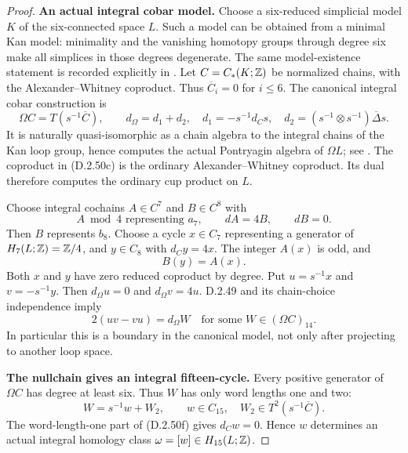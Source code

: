 \begin{proof}
\textbf{An actual integral cobar model.}
Choose a six-reduced simplicial model $K$ of the six-connected
space $L$. Such a model can be obtained from a minimal Kan
model: minimality and the vanishing homotopy groups through
degree six make all simplices in those degrees degenerate.
The same model-existence statement is recorded explicitly in
\cite[proof of Lemma 5.4.2, p.~43 in the opened author version]
{I_ABFJ2022}. Let $C=C_*(K;\mathbb Z)$ be normalized chains, with the
Alexander--Whitney coproduct. Thus $\overline C_i=0$ for
$i\le6$. The canonical integral cobar construction is
\[
 \Omega C=T(s^{-1}\overline C),\qquad
 d_\Omega=d_1+d_2,
 \quad d_1=-s^{-1}d_Cs,
 \quad d_2=(s^{-1}\otimes s^{-1})\overline\Delta s.
 \tag{D.2.50c}
\]
It is naturally quasi-isomorphic as a chain algebra to the
integral chains of the Kan loop group, hence computes the
actual Pontryagin algebra of $\Omega L$; see
\cite[pp.~3 and 5]{FGHHessParentScottTonks2005}.
The coproduct in \textup{(D.2.50c)} is the ordinary
Alexander--Whitney coproduct. Its dual therefore computes the
ordinary cup product on $L$.

Choose integral cochains $A\in C^7$ and $B\in C^8$ with
\[
       A\bmod4\text{ representing }a_7,
       \qquad dA=4B,
       \qquad dB=0.
       \tag{D.2.50d}
\]
Then $B$ represents $b_8$. Choose a cycle $x\in C_7$
representing a generator of $H_7(L;\mathbb Z)=\mathbb Z/4$, and
$y\in C_8$ with $d_Cy=4x$. The integer $A(x)$ is odd, and
\[
                         B(y)=A(x).
                         \tag{D.2.50e}
\]
Both $x$ and $y$ have zero reduced coproduct by degree.
Put $u=s^{-1}x$ and $v=-s^{-1}y$. Then
$d_\Omega u=0$ and $d_\Omega v=4u$. D.2.49 and its
chain-choice independence imply
\[
       2(uv-vu)=d_\Omega W
                    \quad\text{for some }W\in(\Omega C)_{14}.
       \tag{D.2.50f}
\]
In particular this is a boundary in the canonical model,
not only after projecting to another loop space.

\textbf{The nullchain gives an integral fifteen-cycle.}
Every positive generator of $\Omega C$ has degree at least
six. Thus $W$ has only word lengths one and two:
\[
                    W=s^{-1}w+W_2,
             \qquad w\in C_{15},\quad W_2\in T^2(s^{-1}\overline C).
             \tag{D.2.50g}
\]
The word-length-one part of \textup{(D.2.50f)} gives
$d_Cw=0$. Hence $w$ determines an actual integral homology
class $\omega=[w]\in H_{15}(L;\mathbb Z)$.


\end{proof}
